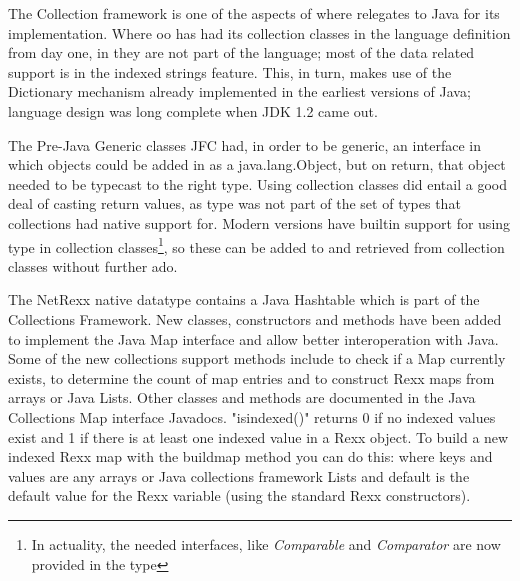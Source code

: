 The Collection framework is one of the aspects of where \nr{}
relegates to Java for its implementation. Where oo\Rexx{} has had its
collection classes in the language definition from day one, in \nr{}
they are not part of the language; most of the data related support is
in the indexed strings feature. This, in turn, makes use of the
Dictionary mechanism already implemented in the earliest versions of Java;
\nr{} language design was long complete when JDK 1.2 came out.

The Pre-Java Generic classes JFC had, in order to be generic, an
interface in which objects could be added in as a java.lang.Object,
but on return, that object needed to be typecast to the right type.
Using collection classes did entail a good deal of casting return
values, as type \Rexx{} was not part of the set of types that
collections had native support for. Modern \nr{} versions
 have builtin support for using type
\Rexx{} in collection classes\footnote{In actuality, the needed
  interfaces, like \emph{Comparable} and \emph{Comparator} are now
  provided in the \Rexx{} type}, so these can be added to and
retrieved from collection classes without further ado. 

The NetRexx native \Rexx{} datatype contains a Java Hashtable which is
part of the Collections Framework. New classes, constructors and
methods have been added to implement the Java Map interface and allow
better interoperation with Java. Some of the new collections support
methods include  to check if a Map currently exists,
 to determine the count of map entries and
 to construct Rexx maps from arrays or
Java Lists. Other classes and methods are documented in the Java
Collections Map interface Javadocs. "isindexed()" returns 0 if no
indexed values exist and 1 if there is at least one indexed value in a
Rexx object. To build a new indexed Rexx map with the buildmap method
you can do this:  where
keys and values are any arrays or Java collections framework Lists and
default is the default value for the Rexx variable (using the standard
Rexx constructors). 

